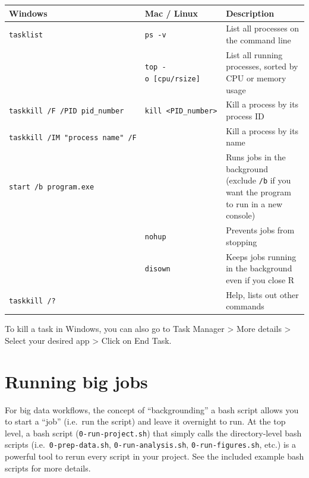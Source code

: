\documentclass[
]{book}
\newcounter{none} %
\begin{document}
{\def\LTcaptype{none} %
\begin{longtable}[]{@{}
  >{\raggedright\arraybackslash}p{}
  >{\raggedright\arraybackslash}p{}
  >{\raggedright\arraybackslash}p{}@{}}
\toprule\noalign{}
\begin{minipage}[b]{\linewidth}\raggedright
Windows
\end{minipage} & \begin{minipage}[b]{\linewidth}\raggedright
Mac / Linux
\end{minipage} & \begin{minipage}[b]{\linewidth}\raggedright
Description
\end{minipage} \\
\midrule\noalign{}
\endhead
\bottomrule\noalign{}
\endlastfoot
\texttt{tasklist} & \texttt{ps\ -v} & List all processes on the command line \\
& \texttt{top\ -o\ {[}cpu/rsize{]}} & List all running processes, sorted by CPU or memory usage \\
\texttt{taskkill\ /F\ /PID\ pid\_number} & \texttt{kill\ \textless{}PID\_number\textgreater{}} & Kill a process by its process ID \\
\texttt{taskkill\ /IM\ "process\ name"\ /F} & & Kill a process by its name \\
\texttt{start\ /b\ program.exe} & & Runs jobs in the background (exclude \texttt{/b} if you want the program to run in a new console) \\
& \texttt{nohup} & Prevents jobs from stopping \\
& \texttt{disown} & Keeps jobs running in the background even if you close R \\
\texttt{taskkill\ /?} & & Help, lists out other commands \\
\end{longtable}
}

To kill a task in Windows, you can also go to Task Manager \textgreater{} More details \textgreater{} Select your desired app \textgreater{} Click on End Task.

\section{Running big jobs}\label{running-big-jobs}

For big data workflows, the concept of ``backgrounding'' a bash script allows you to start a ``job'' (i.e.~run the script) and leave it overnight to run. At the top level, a bash script (\texttt{0-run-project.sh}) that simply calls the directory-level bash scripts (i.e.~\texttt{0-prep-data.sh}, \texttt{0-run-analysis.sh}, \texttt{0-run-figures.sh}, etc.) is a powerful tool to rerun every script in your project. See the included example bash scripts for more details.
\end{document}
